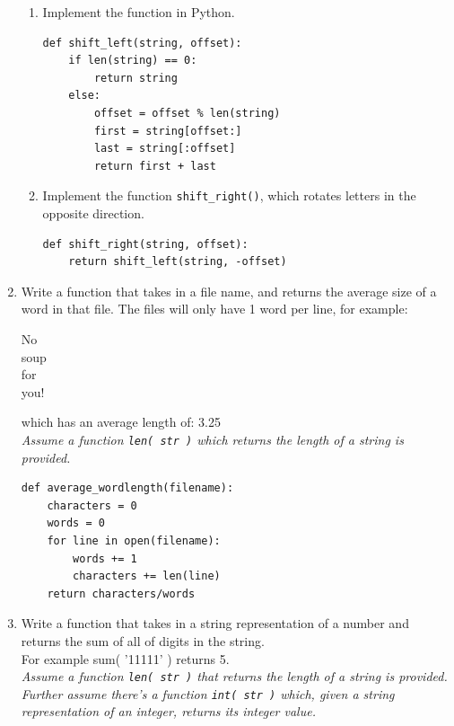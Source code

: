 \documentclass[11pt]{article}
\newenvironment{answer}{\large\lstset{basicstyle=\large}\color{white}}{}
\newenvironment{answer}{\large\lstset{basicstyle=\large}\color{red}}{}
\begin{document}
\begin{enumerate}
\begin{enumerate}
        \item Implement the function in Python.

\begin{answer}
\begin{lstlisting}
def shift_left(string, offset):
    if len(string) == 0:
        return string
    else:
        offset = offset % len(string)
        first = string[offset:]
        last = string[:offset]
        return first + last
\end{lstlisting}
\end{answer}

        \item Implement the function {\tt shift\_right()}, which rotates letters
            in the opposite direction.

\begin{answer}
\begin{lstlisting}
def shift_right(string, offset):
    return shift_left(string, -offset)
\end{lstlisting}
\vspace{0.5in}
\end{answer}

    \end{enumerate}
\pagebreak
    \item Write a function that takes in a file name, and returns the average
        size of a word in that file. The files will only have 1 word per line,
        for example:

        \begin{center}
        No\\
        soup\\
        for\\
        you!
        \end{center}

        which has an average length of: 3.25 \\ \emph{Assume a function \texttt{len( str )} which returns the length of a string is provided.}


\begin{answer}
\begin{lstlisting}
def average_wordlength(filename):
    characters = 0
    words = 0
    for line in open(filename):
        words += 1
        characters += len(line)
    return characters/words
\end{lstlisting}
\end{answer}

    \item Write a function that takes in a string representation of a number and returns the sum
        of all of digits in the string. \\For example sum( '11111' ) returns 5. \\
        \emph{Assume a function \texttt{len( str )} that returns the length of a string is provided. \\
         Further assume there's a function \texttt{int( str )} which, given a string representation of an integer, returns its integer value.}


\end{enumerate}
\end{document}
